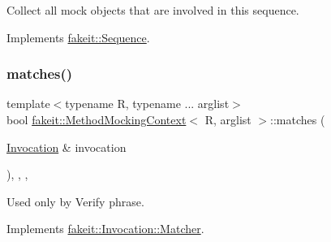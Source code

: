 Collect all mock objects that are involved in this sequence. 



Implements \mbox{\hyperlink{classfakeit_1_1Sequence_a4af96a0de0fa659fe826431e4d61757a}{fakeit\+::\+Sequence}}.

\mbox{\label{classfakeit_1_1MethodMockingContext_a240fe9e15cffcebd52f5b0c9ccf87654}} 
\subsubsection{\texorpdfstring{matches()}{matches()}\hspace{0.1cm}{\footnotesize\ttfamily [1/9]}}
{\footnotesize\ttfamily template$<$typename R, typename ... arglist$>$ \\
bool \mbox{\hyperlink{classfakeit_1_1MethodMockingContext}{fakeit\+::\+Method\+Mocking\+Context}}$<$ R, arglist $>$\+::matches (\begin{DoxyParamCaption}\item[{\mbox{\hyperlink{structfakeit_1_1Invocation}{Invocation}} \&}]{invocation }\end{DoxyParamCaption})\hspace{0.3cm}{\ttfamily [inline]}, {\ttfamily [override]}, {\ttfamily [protected]}, {\ttfamily [virtual]}}



Used only by Verify phrase. 



Implements \mbox{\hyperlink{structfakeit_1_1Invocation_1_1Matcher_a77b45c801fe29889c148516df1ffcb06}{fakeit\+::\+Invocation\+::\+Matcher}}.

\mbox{\label{classfakeit_1_1MethodMockingContext_a240fe9e15cffcebd52f5b0c9ccf87654}} 
